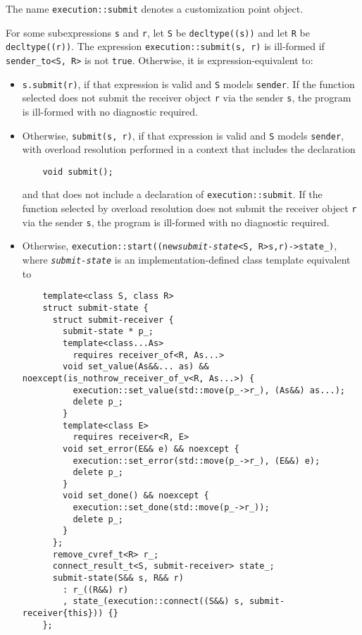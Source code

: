 \documentclass[a4paper,12pt,notitlepage,twoside,openright]{article}
\begin{document}
The name \texttt{execution::submit} denotes a customization
point object.

For some subexpressions \texttt{s} and
\texttt{r}, let \texttt{S} be
\texttt{decltype((s))} and let \texttt{R} be
\texttt{decltype((r))}. The expression
\texttt{execution::submit(s, r)} is ill-formed if
\texttt{sender_to<S, R>} is not \texttt{true}.
Otherwise, it is expression-equivalent to:

\begin{itemize}
\item
  \texttt{s.submit(r)}, if that expression is valid and
  \texttt{S} models \texttt{sender}. If the
  function selected does not submit the receiver object
  \texttt{r} via the sender \texttt{s}, the
  program is ill-formed with no diagnostic required.
\item
  Otherwise, \texttt{submit(s, r)}, if that expression is
  valid and \texttt{S} models \texttt{sender},
  with overload resolution performed in a context that includes the
  declaration

  \begin{verbatim}
    void submit();
  \end{verbatim}

  and that does not include a declaration of
  \texttt{execution::submit}. If the function selected by
  overload resolution does not submit the receiver object
  \texttt{r} via the sender \texttt{s}, the
  program is ill-formed with no diagnostic required.
\item
  Otherwise,
  \texttt{execution::start((new}\emph{\texttt{submit-state}}\texttt{<S, R>{s,r})->state_)},
  where \emph{\texttt{submit-state}} is an
  implementation-defined class template equivalent to

  \begin{verbatim}
    template<class S, class R>
    struct submit-state {
      struct submit-receiver {
        submit-state * p_;
        template<class...As>
          requires receiver_of<R, As...>
        void set_value(As&&... as) && noexcept(is_nothrow_receiver_of_v<R, As...>) {
          execution::set_value(std::move(p_->r_), (As&&) as...);
          delete p_;
        }
        template<class E>
          requires receiver<R, E>
        void set_error(E&& e) && noexcept {
          execution::set_error(std::move(p_->r_), (E&&) e);
          delete p_;
        }
        void set_done() && noexcept {
          execution::set_done(std::move(p_->r_));
          delete p_;
        }
      };
      remove_cvref_t<R> r_;
      connect_result_t<S, submit-receiver> state_;
      submit-state(S&& s, R&& r)
        : r_((R&&) r)
        , state_(execution::connect((S&&) s, submit-receiver{this})) {}
    };
  \end{verbatim}
\end{itemize}
\end{document}
